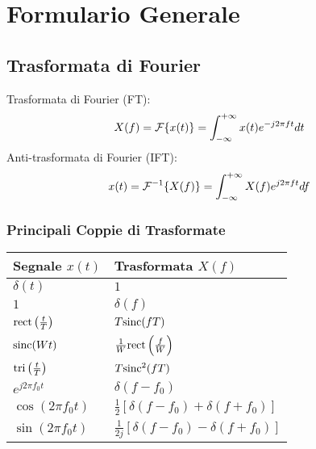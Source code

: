 \chapter*{Formulario Generale}

\begin{multicols}{2} %

\section{Trasformata di Fourier}
\begin{definition}
Trasformata di Fourier (FT):
$$ X(f) = \mathcal{F}\{x(t)\} = \int_{-\infty}^{+\infty} x(t) e^{-j2\pi f t} dt $$
Anti-trasformata di Fourier (IFT):
$$ x(t) = \mathcal{F}^{-1}\{X(f)\} = \int_{-\infty}^{+\infty} X(f) e^{j2\pi f t} df $$
\end{definition}

\subsection*{Principali Coppie di Trasformate}
\begin{tabular}{ll}
\toprule
\textbf{Segnale $x(t)$} & \textbf{Trasformata $X(f)$} \\
\midrule
$\delta(t)$ & $1$ \\
$1$ & $\delta(f)$ \\
$\text{rect}\left(\frac{t}{T}\right)$ & $T \text{sinc}(fT)$ \\
$\text{sinc}(Wt)$ & $\frac{1}{W}\text{rect}\left(\frac{f}{W}\right)$ \\
$\text{tri}\left(\frac{t}{T}\right)$ & $T \text{sinc}^2(fT)$ \\
$e^{j2\pi f_0 t}$ & $\delta(f - f_0)$ \\
$\cos(2\pi f_0 t)$ & $\frac{1}{2}[\delta(f-f_0) + \delta(f+f_0)]$ \\
$\sin(2\pi f_0 t)$ & $\frac{1}{2j}[\delta(f-f_0) - \delta(f+f_0)]$ \\
\bottomrule
\end{tabular}


\end{multicols}
